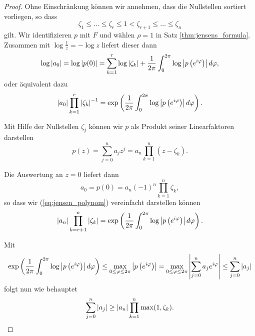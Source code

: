 \begin{proof}
    Ohne Einschränkung können wir annehmen, dass die Nullstellen sortiert
    vorliegen, so dass
    \[
        \zeta_1 \leq \dots \leq \zeta_r \leq 1 < \zeta_{r+1} \leq \dots \leq \zeta_n
    \]
    gilt.
    Wir identifizieren $p$ mit $F$ und wählen $\rho =1$ in Satz
    \ref{thm:jensens_formula}.
    Zusammen mit $\log \frac{1}{z} = -\log z$ liefert dieser dann
    \[
        \log \left\lvert a_0 \right\rvert
        = \log \left\lvert p(0) \right\rvert
        = \sum_{k=1}^{r} \log \left\lvert \zeta_k \right\rvert + \frac{1}{2\pi} \int_{0}^{2\pi} \log \left\lvert p\left( e^{i\varphi} \right) \right\rvert d\varphi,
    \]
    oder äquivalent dazu
    \begin{equation}
        \label{eq:jensen_polynom}
        \left\lvert a_0 \right\rvert \prod_{k=1}^{r} \left\lvert \zeta_k \right\rvert^{-1}
        = \exp\left( \frac{1}{2\pi} \int_{0}^{2\pi} \log \left\lvert p\left( e^{i\varphi} \right) \right\rvert d\varphi \right).
    \end{equation}

    \noindent Mit Hilfe der Nullstellen $\zeta_j$ können wir $p$ als Produkt
    seiner Linearfaktoren darstellen
    \[
        p(z) = \sum_{j = 0}^{n} a_j z^j = a_n \prod_{k=1}^n (z-\zeta_k).
    \]

    \noindent Die Auswertung an $z=0$ liefert dann
    \[
        a_0 = p(0) = a_n (-1)^n \prod_{k=1}^n \zeta_k,
    \]
    so dass wir (\ref{eq:jensen_polynom}) vereinfacht darstellen können
    \[
        \left\lvert a_n \right\rvert \prod_{k=r+1}^{n} \left\lvert \zeta_k \right\rvert
        = \exp\left( \frac{1}{2\pi} \int_{0}^{2\pi} \log \left\lvert p\left( e^{i\varphi} \right) \right\rvert d\varphi \right).
    \]

    \noindent Mit
    \begin{equation}
        \label{eq:jensen_integral_estimation}
        \exp\left( \frac{1}{2\pi} \int_{0}^{2\pi} \log \left\lvert p\left( e^{i\varphi} \right) \right\rvert d\varphi \right)
        \leq \max_{0 \leq \varphi \leq 2\pi} \left\lvert p\left( e^{i\varphi} \right)  \right\rvert
        = \max_{0 \leq \varphi \leq 2\pi} \left\lvert \sum_{j=0}^{n} a_j e^{i\varphi} \right\rvert
        \leq \sum_{j=0}^{n} \left\lvert a_j \right\rvert
    \end{equation}
    folgt nun wie behauptet
    \[
        \sum_{j=0}^n \left\lvert a_j \right\rvert \geq \left\lvert a_n \right\rvert \prod_{k=1}^n \max(1, \zeta_k).
    \]


\end{proof}
